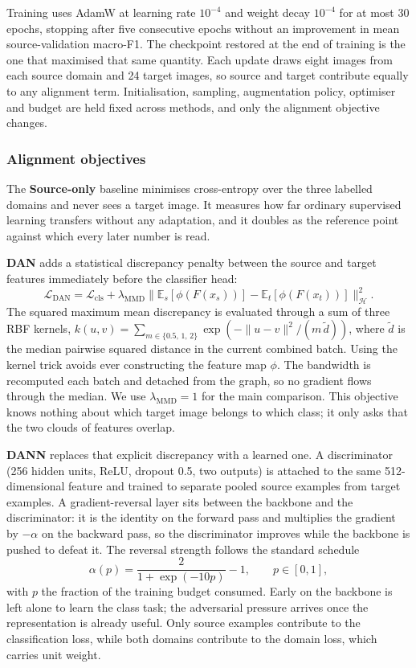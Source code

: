 Training uses AdamW at learning rate $10^{-4}$ and weight decay $10^{-4}$ for at
most 30 epochs, stopping after five consecutive epochs without an improvement in
mean source-validation macro-F1. The checkpoint restored at the end of training
is the one that maximised that same quantity. Each update draws eight images from
each source domain and 24 target images, so source and target contribute equally
to any alignment term. Initialisation, sampling, augmentation policy, optimiser
and budget are held fixed across methods, and only the alignment objective
changes.

\subsubsection{Alignment objectives}

The \textbf{Source-only} baseline minimises cross-entropy over the three labelled
domains and never sees a target image. It measures how far ordinary supervised
learning transfers without any adaptation, and it doubles as the reference point
against which every later number is read.

\textbf{DAN} adds a statistical discrepancy penalty between the source and target
features immediately before the classifier head:
\begin{equation}
\mathcal{L}_{\mathrm{DAN}}
  = \mathcal{L}_{\mathrm{cls}}
  + \lambda_{\mathrm{MMD}}
    \bigl\lVert \mathbb{E}_s[\phi(F(x_s))] - \mathbb{E}_t[\phi(F(x_t))] \bigr\rVert^2_{\mathcal{H}} .
\end{equation}
The squared maximum mean discrepancy is evaluated through a sum of three RBF
kernels,
$k(u,v) = \sum_{m \in \{0.5,\,1,\,2\}} \exp\!\left(-\lVert u-v \rVert^2 / (m\,\tilde{d})\right)$,
where $\tilde{d}$ is the median pairwise squared distance in the current combined
batch. Using the kernel trick avoids ever constructing the feature map $\phi$.
The bandwidth is recomputed each batch and detached from the graph, so no
gradient flows through the median. We use $\lambda_{\mathrm{MMD}} = 1$ for the
main comparison. This objective knows nothing about which target image belongs to
which class; it only asks that the two clouds of features overlap.

\textbf{DANN} replaces that explicit discrepancy with a learned one. A
discriminator (256 hidden units, ReLU, dropout 0.5, two outputs) is attached to
the same 512-dimensional feature and trained to separate pooled source examples
from target examples. A gradient-reversal layer sits between the backbone and the
discriminator: it is the identity on the forward pass and multiplies the gradient
by $-\alpha$ on the backward pass, so the discriminator improves while the
backbone is pushed to defeat it. The reversal strength follows the standard
schedule
\begin{equation}
\alpha(p) = \frac{2}{1 + \exp(-10p)} - 1, \qquad p \in [0,1],
\end{equation}
with $p$ the fraction of the training budget consumed. Early on the backbone is
left alone to learn the class task; the adversarial pressure arrives once the
representation is already useful. Only source examples contribute to the
classification loss, while both domains contribute to the domain loss, which
carries unit weight.

